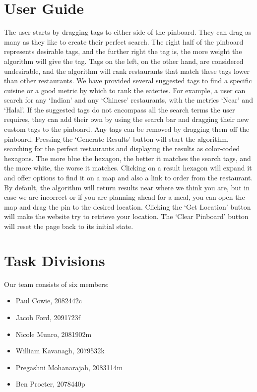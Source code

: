 \documentclass[10pt,a4paper]{article}
\begin{document}
\section*{User Guide}

The user starts by dragging tags to either side of the pinboard. They can drag as many as they like to create their perfect search. The right half of the pinboard represents desirable tags, and the further right the tag is, the more weight the algorithm will give the tag. Tags on the left, on the other hand, are considered undesirable, and the algorithm will rank restaurants that match these tags lower than other restaurants. We have provided several suggested tags to find a specific cuisine or a good metric by which to rank the eateries. For example, a user can search for any ‘Indian’ and any ‘Chinese’ restaurants, with the metrics ‘Near’ and ‘Halal’. If the suggested tags do not encompass all the search terms the user requires, they can add their own by using the search bar and dragging their new custom tags to the pinboard. Any tags can be removed by dragging them off the pinboard. Pressing the ‘Generate Results’ button will start the algorithm, searching for the perfect restaurants and displaying the results as color-coded hexagons. The more blue the hexagon, the better it matches the search tags, and the more white, the worse it matches. Clicking on a result hexagon will expand it and offer options to find it on a map and also a link to order from the restaurant. By default, the algorithm will return results near where we think you are, but in case we are incorrect or if you are planning ahead for a meal, you can open the map and drag the pin to the desired location. Clicking the ‘Get Location’ button will make the website try to retrieve your location. The ‘Clear Pinboard’ button will reset the page back to its initial state.

\section*{Task Divisions}

Our team consists of six members:
\begin{itemize}
	\item Paul Cowie, 2082442c
	\item Jacob Ford, 2091723f
	\item Nicole Munro, 2081902m
	\item William Kavanagh, 2079532k
	\item Pregashni Mohanarajah, 2083114m
	\item Ben Procter, 2078440p
\end{itemize}
\end{document}
